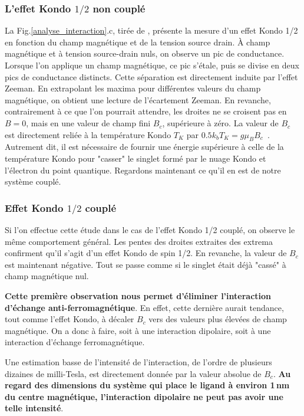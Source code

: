\subsubsection{L'effet Kondo $1/2$ non couplé}
La Fig.\ref{analyse_interaction}.c, tirée de \cite{Roch2009}, présente la mesure d'un effet Kondo 1/2 en fonction du champ magnétique et de la tension source drain. \`A champ magnétique et  à tension source-drain nuls, on observe un pic de conductance. Lorsque l'on applique un champ magnétique, ce pic s'étale, puis se divise en deux pics de conductance distincts. Cette séparation est directement induite par l'effet Zeeman. En extrapolant les maxima pour différentes valeurs du champ magnétique, on obtient une lecture de l'écartement Zeeman. En revanche, contrairement à ce que l'on pourrait attendre, les droites ne se croisent pas en $B=0$, mais en une valeur de champ fini $B_c$, supérieure à zéro. La valeur de $B_c$ est directement reliée à la température Kondo $T_K$ par $0.5 k_bT_K = g \mu_B B_c$~\cite{Roch2009}. Autrement dit, il est nécessaire de fournir une énergie supérieure à celle de la température Kondo pour "casser" le singlet formé par le nuage Kondo et l'électron du point quantique. Regardons maintenant ce qu'il en est de notre système couplé.

\subsubsection{Effet Kondo $1/2$ couplé} 
Si l'on effectue cette étude dans le cas de l'effet Kondo 1/2 couplé, on observe le même comportement général. Les pentes des droites extraites des extrema confirment qu'il s'agit d'un effet Kondo de spin 1/2. En revanche, la valeur de $B_c$ est maintenant négative. Tout se passe comme si le singlet était déjà "cassé" à champ magnétique nul. 

\textbf{Cette première observation nous permet d'éliminer l'interaction d'échange anti-ferromagnétique}. En effet, cette dernière aurait tendance, tout comme l'effet Kondo, à décaler $B_c$ vers des valeurs plus élevées de champ magnétique. On a donc à faire, soit à une interaction dipolaire, soit à une interaction d'échange ferromagnétique.

Une estimation basse de l'intensité de l'interaction, de l'ordre de plusieurs dizaines de milli-Tesla, est directement donnée par la valeur absolue de $B_c$. \textbf{Au regard des dimensions du système qui place le ligand à environ 1\,nm du centre magnétique, l'interaction dipolaire ne peut pas avoir une telle intensité}. 

